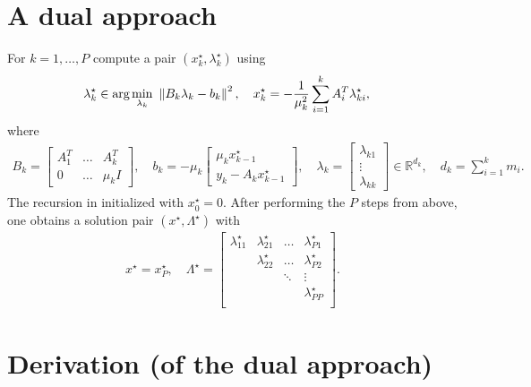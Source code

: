 \documentclass[12pt]{article}
\begin{document}
\section{A dual approach}

For $k=1,\dots,P$ compute a pair $(x_k^{\star},\lambda_{k}^{\star})$ using
%
\begin{align}
\lambda_k^{\star} \in \mbox{arg} \min_{\lambda_{k}} \  & \left\lVert B_k\lambda_{k} - b_k\right\rVert^2, \quad
x_k^{\star} = -\frac{1}{\mu_k^2}\sum_{i=1}^{k}A_i^T\lambda_{ki}^{\star},
\end{align}
%
where
%
\begin{align*}
B_k = \begin{bmatrix}A_1^T & \dots & A_k^T \\ 0 & \dots & \mu_kI \end{bmatrix}, \quad
b_k = -\mu_k\begin{bmatrix} \mu_k x_{k-1}^{\star} \\ y_k - A_kx_{k-1}^{\star} \end{bmatrix}, \quad
\lambda_{k} = \begin{bmatrix} \lambda_{k1} \\ \vdots \\ \lambda_{kk} \end{bmatrix} \in \mathbb{R}^{d_k}, \quad
d_k = \sum_{i=1}^{k}m_i.
\end{align*}
%
The recursion in initialized with $x_0^{\star} = 0$. After performing the $P$ steps from above, one
obtains a solution pair $(x^{\star}, \Lambda^{\star})$ with
%
\begin{align}
x^{\star} = x_P^{\star}, \quad
\Lambda^{\star} =
\begin{bmatrix}
  \lambda_{11}^{\star} & \lambda_{21}^{\star} & \dots  &\lambda_{P1}^{\star} \\
                       & \lambda_{22}^{\star} & \dots  &\lambda_{P2}^{\star} \\
                       &                      & \ddots & \vdots \\
                       &                      &        &\lambda_{PP}^{\star} \\
\end{bmatrix}.
\end{align}

\newpage

\section{Derivation (of the dual approach)}
\end{document}
